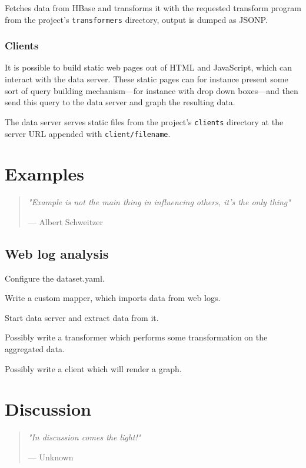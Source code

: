 \documentclass[a4paper,10pt]{book}
\newcommand{\chapterquote}[2] {
\begin{quote}
\textit{"{#1}"}

--- {#2}
\end{quote}

\vspace{24pt}
}
\begin{document}
Fetches data from HBase and transforms it with the requested transform
program from the project's \texttt{transformers} directory, output is
dumped as JSONP.


\subsection{Clients}

It is possible to build static web pages out of HTML and JavaScript, which
can interact with the data server. These static pages can for instance
present some sort of query building mechanism---for instance with drop down
boxes---and then send this query to the data server and graph the resulting
data.

The data server serves static files from the project's \texttt{clients}
directory at the server URL appended with \texttt{client/filename}.



\chapter{Examples}

\chapterquote{Example is not the main thing in influencing others, it's
the only thing}{Albert Schweitzer}




\section{Web log analysis}

Configure the dataset.yaml.

Write a custom mapper, which imports data from web logs.

Start data server and extract data from it.

Possibly write a transformer which performs some transformation on the
aggregated data.

Possibly write a client which will render a graph.



\chapter{Discussion}

\chapterquote{In discussion comes the light!}{Unknown}
\end{document}
